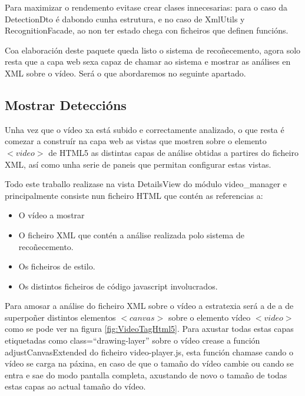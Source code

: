             Para maximizar o rendemento evitase crear clases innecesarias: para o caso da DetectionDto é dabondo
            cunha estrutura, e no caso de XmlUtils y RecognitionFacade, ao non ter estado chega con ficheiros
            que definen funcións.
            
            Coa elaboración deste paquete queda listo o sistema de recoñecemento, agora solo resta que a capa web
            sexa capaz de chamar ao sistema e mostrar as análises en XML sobre o vídeo. Será o que abordaremos
            no seguinte apartado.

    \subsection{Mostrar Deteccións}
        
        Unha vez que o vídeo xa está subido e correctamente analizado, o que resta é comezar a construír
        na capa web as vistas que mostren sobre o elemento $<video>$ de HTML5 as distintas capas de 
        análise obtidas a partires do ficheiro XML, así como unha serie de paneis que permitan 
        configurar estas vistas.
        
        Todo este traballo realizase na vista DetailsView do módulo video\_manager e principalmente 
        consiste nun ficheiro HTML que contén as referencias a:
        \begin{itemize}
        \item O vídeo a mostrar
        \item O ficheiro XML que contén a análise realizada polo sistema de recoñecemento.
        \item Os ficheiros de estilo.
        \item Os distintos ficheiros de código javascript involucrados.
        \end{itemize}
        
        Para amosar a análise do ficheiro XML sobre o vídeo a estratexia será a de a de superpoñer 
        distintos elementos $<canvas>$ sobre o elemento vídeo $<video>$ como se pode ver na figura 
        \ref{fig:VideoTagHtml5}. Para axustar todas estas capas etiquetadas como class=``drawing-layer''
        sobre o vídeo crease a función adjustCanvasExtended do ficheiro video-player.js, esta función 
        chamase cando o vídeo se carga na páxina, en caso de que o tamaño do vídeo cambie ou cando se 
        entra e sae do modo pantalla completa, axustando de novo o tamaño de todas estas capas ao actual
        tamaño do vídeo.
        
